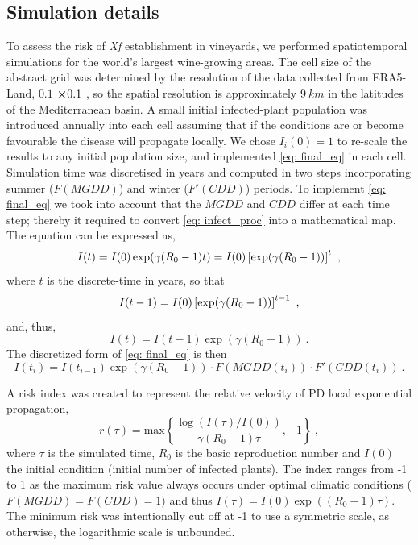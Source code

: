 \subsection{Simulation details}\label{app:risk_index}

To assess the risk of \textit{Xf} establishment in vineyards, we performed
spatiotemporal simulations for the world's largest wine-growing areas. The cell
size of the abstract grid was determined by the resolution of the data
collected from ERA5-Land, $0.1$ \textdegree $\cross 0.1$ \textdegree , so the
spatial resolution is approximately $\SI{9}{km}$ in the latitudes of the
Mediterranean basin. A small initial infected-plant population was introduced
annually into each cell assuming that if the conditions are or become
favourable the disease will propagate locally. We chose $I_i(0)=1$ to re-scale
the results to any initial population size, and implemented \cref{eq: final_eq}
in each cell. Simulation time was discretised in years and computed in two
steps incorporating summer ($F(MGDD)$) and winter ($F'(CDD)$) periods. To
implement \cref{eq: final_eq} we took into account that the $MGDD$ and $CDD$
differ at each time step; thereby it required to convert \cref{eq: infect_proc}
into a mathematical map. The equation can be expressed as,
\begin{equation}
    I(t)=I(0)\exp(\gamma(R_0-1)t)=I(0)\left[\exp(\gamma(R_0-1))\right]^t \ ,
\end{equation}
where $t$ is the discrete-time in years,
so that
\begin{equation}
    I(t-1)=I(0)\left[\exp(\gamma(R_0-1))\right]^{t-1} \ ,
\end{equation}
and, thus,
\begin{equation}
    I(t)=I(t-1)\exp(\gamma(R_0-1)) \ .
\end{equation}
The discretized form of \cref{eq: final_eq} is then
\begin{equation}
    I(t_i)=I(t_{i-1})\exp(\gamma(R_0-1))\cdot F(MGDD(t_i))\cdot
    F'(CDD(t_i)) \ .
    \label{eq:imapevol}
\end{equation}

A risk index was created to represent the relative velocity of PD local
exponential propagation,
\begin{equation}
    r(\tau)=\textrm{max}\left\{
    \frac{\log(I(\tau)/I(0))}{\gamma(R_0-1)\tau}, -1
    \right\} \ ,
    \label{eq:riskindex}
\end{equation}
where $\tau$ is the simulated time, $R_0$ is the basic reproduction number
and $I(0)$ the initial condition (initial number of infected plants). The index
ranges from -1 to 1 as the maximum risk value always occurs under optimal
climatic conditions ($F(MGDD)=F(CDD)=1)$ and thus
$I(\tau)=I(0)\exp((R_0-1)\tau)$. The minimum risk was intentionally cut off at
-1 to use a symmetric scale, as otherwise, the logarithmic scale is unbounded.

